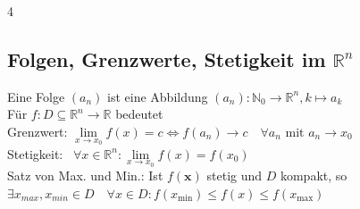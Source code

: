 \documentclass[6pt,a4paper]{scrartcl}
\newcommand{\norm}[1]{\ensuremath{\|#1\|}}                                                      %
\renewcommand{\vec}[1]{\ensuremath{\boldsymbol {#1}}}                                           %
\begin{document}
\begin{multicols*}{4}
    \subsection{Folgen, Grenzwerte, Stetigkeit im $\mathbb R^n$}
    Eine Folge $(a_n)$ ist eine Abbildung $(a_n):\mathbb N_0 \rightarrow \mathbb R^n, k\mapsto a_k$\\
    Für $f:D \subseteq \mathbb R^n \rightarrow \mathbb R$ bedeutet \\
Grenzwert: \quad  $\lim\limits_{x \rightarrow x_0} f(x) = c 
\Leftrightarrow 
f(a_n) \rightarrow c \quad \forall a_n \text{ mit } a_n \rightarrow x_0$\\
    Stetigkeit: \quad \ $\forall x \in \mathbb R^n:\lim\limits_{x \rightarrow x_0} f(x) = f(x_0)$\\
    Satz von Max. und Min.: Ist $f(\vec x)$ stetig und $D$ kompakt, so\\
    $\exists x_{max},x_{min} \in D \quad \forall x\in D:f(x_{\text{min}}) \le f(x) \le f(x_{\text{max}})$


\end{multicols*}
\end{document}
